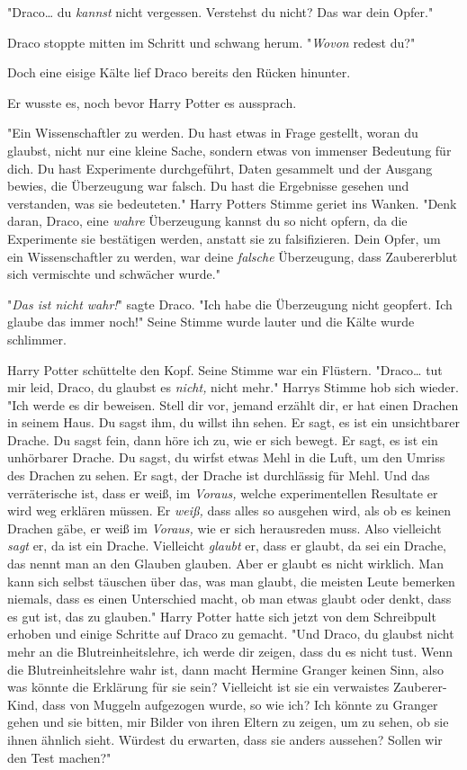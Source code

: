 {"Draco… du \emph{kannst} nicht vergessen. Verstehst du nicht? Das war dein Opfer."

Draco stoppte mitten im Schritt und schwang herum. "\emph{Wovon} redest du?"

Doch eine eisige Kälte lief Draco bereits den Rücken hinunter.

Er wusste es, noch bevor Harry Potter es aussprach.

"Ein Wissenschaftler zu werden. Du hast etwas in Frage gestellt, woran du glaubst, nicht nur eine kleine Sache, sondern etwas von immenser Bedeutung für dich. Du hast Experimente durchgeführt, Daten gesammelt und der Ausgang bewies, die Überzeugung war falsch. Du hast die Ergebnisse gesehen und verstanden, was sie bedeuteten." Harry Potters Stimme geriet ins Wanken. "Denk daran, Draco, eine \emph{wahre} Überzeugung kannst du so nicht opfern, da die Experimente sie bestätigen werden, anstatt sie zu falsifizieren. Dein Opfer, um ein Wissenschaftler zu werden, war deine \emph{falsche} Überzeugung, dass Zaubererblut sich vermischte und schwächer wurde."

"\emph{Das ist nicht wahr!}" sagte Draco. "Ich habe die Überzeugung nicht geopfert. Ich glaube das immer noch!" Seine Stimme wurde lauter und die Kälte wurde schlimmer.

Harry Potter schüttelte den Kopf. Seine Stimme war ein Flüstern. "Draco… tut mir leid, Draco, du glaubst es \emph{nicht,} nicht mehr." Harrys Stimme hob sich wieder. "Ich werde es dir beweisen. Stell dir vor, jemand erzählt dir, er hat einen Drachen in seinem Haus. Du sagst ihm, du willst ihn sehen. Er sagt, es ist ein unsichtbarer Drache. Du sagst fein, dann höre ich zu, wie er sich bewegt. Er sagt, es ist ein unhörbarer Drache. Du sagst, du wirfst etwas Mehl in die Luft, um den Umriss des Drachen zu sehen. Er sagt, der Drache ist durchlässig für Mehl. Und das verräterische ist, dass er weiß, im \emph{Voraus,} welche experimentellen Resultate er wird weg erklären müssen. Er \emph{weiß,} dass alles so ausgehen wird, als ob es keinen Drachen gäbe, er weiß im \emph{Voraus,} wie er sich herausreden muss. Also vielleicht \emph{sagt} er, da ist ein Drache. Vielleicht \emph{glaubt} er, dass er glaubt, da sei ein Drache, das nennt man an den Glauben glauben. Aber er glaubt es nicht wirklich. Man kann sich selbst täuschen über das, was man glaubt, die meisten Leute bemerken niemals, dass es einen Unterschied macht, ob man etwas glaubt oder denkt, dass es gut ist, das zu glauben." Harry Potter hatte sich jetzt von dem Schreibpult erhoben und einige Schritte auf Draco zu gemacht. "Und Draco, du glaubst nicht mehr an die Blutreinheitslehre, ich werde dir zeigen, dass du es nicht tust. Wenn die Blutreinheitslehre wahr ist, dann macht Hermine Granger keinen Sinn, also was könnte die Erklärung für sie sein? Vielleicht ist sie ein verwaistes Zauberer-Kind, dass von Muggeln aufgezogen wurde, so wie ich? Ich könnte zu Granger gehen und sie bitten, mir Bilder von ihren Eltern zu zeigen, um zu sehen, ob sie ihnen ähnlich sieht. Würdest du erwarten, dass sie anders aussehen? Sollen wir den Test machen?"

}
